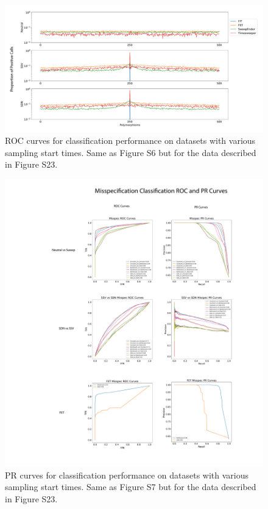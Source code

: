 \begin{figure}
    \centering
    \includegraphics[width=\textwidth]{figures/ap1/S31_Zoomed_Spikes.pdf}
    \caption[ROC curves for classification performance on datasets with various sampling start times.]{ROC curves for classification performance on datasets with various sampling start times. Same as Figure S6 but for the data described in Figure S23.}
    \label{fig:S31_Zoomed_Spikes}
\end{figure}

\begin{figure}
    \centering
    \includegraphics[width=\textwidth]{figures/ap1/S32_Misspec_Classification.pdf}
    \caption[PR curves for classification performance on datasets with various sampling start times.]{PR curves for classification performance on datasets with various sampling start times. Same as Figure S7 but for the data described in Figure S23.}
    \label{fig:S32_Misspec_Classification}
\end{figure}

